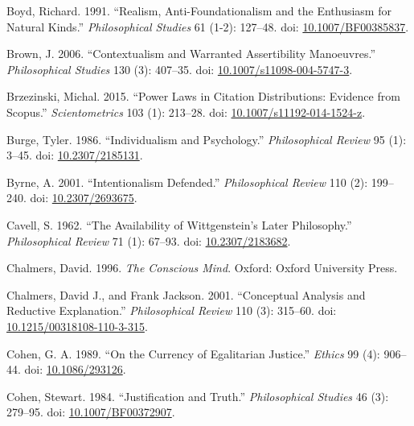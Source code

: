 \documentclass[
  10pt,
  letterpaper,
  DIV=11,
  numbers=noendperiod,
  twoside]{scrartcl}
\newlength{\cslhangindent}
\newenvironment{CSLReferences}[2] %
 {\begin{list}{}{%
  \setlength{\itemindent}{0pt}
  \setlength{\leftmargin}{0pt}
  \setlength{\parsep}{0pt}
  \ifodd #1
   \setlength{\leftmargin}{\cslhangindent}
   \setlength{\itemindent}{-1\cslhangindent}
  \fi
  \setlength{\itemsep}{#2\baselineskip}}}
 {\end{list}}
\begin{document}
\begin{CSLReferences}{1}{0}
Boyd, Richard. 1991. {``Realism, Anti-Foundationalism and the Enthusiasm
for Natural Kinds.''} \emph{Philosophical Studies} 61 (1-2): 127--48.
doi: \href{https://doi.org/10.1007/BF00385837}{10.1007/BF00385837}.

Brown, J. 2006. {``Contextualism and Warranted Assertibility
Manoeuvres.''} \emph{Philosophical Studies} 130 (3): 407--35. doi:
\href{https://doi.org/10.1007/s11098-004-5747-3}{10.1007/s11098-004-5747-3}.

Brzezinski, Michal. 2015. {``Power Laws in Citation Distributions:
Evidence from Scopus.''} \emph{Scientometrics} 103 (1): 213--28. doi:
\href{https://doi.org/10.1007/s11192-014-1524-z}{10.1007/s11192-014-1524-z}.

Burge, Tyler. 1986. {``Individualism and Psychology.''}
\emph{Philosophical Review} 95 (1): 3--45. doi:
\href{https://doi.org/10.2307/2185131}{10.2307/2185131}.

Byrne, A. 2001. {``Intentionalism Defended.''} \emph{Philosophical
Review} 110 (2): 199--240. doi:
\href{https://doi.org/10.2307/2693675}{10.2307/2693675}.

Cavell, S. 1962. {``The Availability of Wittgenstein's Later
Philosophy.''} \emph{Philosophical Review} 71 (1): 67--93. doi:
\href{https://doi.org/10.2307/2183682}{10.2307/2183682}.

Chalmers, David. 1996. \emph{The Conscious Mind}. Oxford: Oxford
University Press.

Chalmers, David J., and Frank Jackson. 2001. {``Conceptual Analysis and
Reductive Explanation.''} \emph{Philosophical Review} 110 (3): 315--60.
doi:
\href{https://doi.org/10.1215/00318108-110-3-315}{10.1215/00318108-110-3-315}.

Cohen, G. A. 1989. {``On the Currency of Egalitarian Justice.''}
\emph{Ethics} 99 (4): 906--44. doi:
\href{https://doi.org/10.1086/293126}{10.1086/293126}.

Cohen, Stewart. 1984. {``Justification and Truth.''} \emph{Philosophical
Studies} 46 (3): 279--95. doi:
\href{https://doi.org/10.1007/BF00372907}{10.1007/BF00372907}.


\end{CSLReferences}
\end{document}
